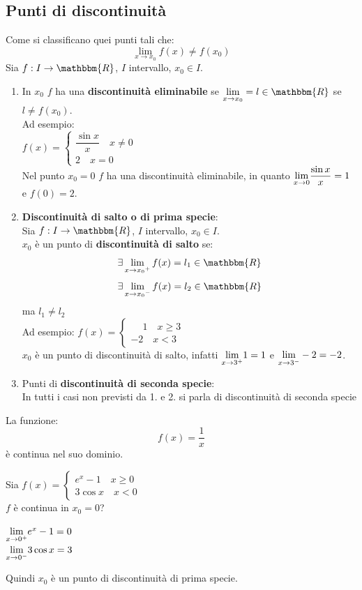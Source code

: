 \documentclass[12pt]{report}
\newcounter{exercise}
\begin{document}
  	\subsection{Punti di discontinuità}
  	Come si classificano quei punti tali che:
  	\[
  	\lim_{x \to {x_0}}f(x) \neq f(x_0)
  	\]
 	Sia $f: I \to \mathbbm{R}$, $I$ intervallo, $x_0 \in I$.		\begin{enumerate}
 		\item In $x_0$ $f$ ha una \textbf{discontinuità eliminabile} se $\mathlarger{\lim_{x \to {x_0}}} = l \in \mathbbm{R}$ se $l \neq f(x_0)$. \\
 		Ad esempio: \\

 		$f(x)=\begin{cases}
 			\dfrac{\sin x}{x} \quad x \neq 0 \\
 			2 \quad x = 0
 		\end{cases}$ \\
 		Nel punto $x_0 = 0$ $f$ ha una discontinuità eliminabile, in quanto $\mathlarger{\lim_{x \to 0}}\dfrac{\sin x}{x} = 1$ e $f(0) = 2$.
 		\item \textbf{Discontinuità di salto o di prima specie}: \\
 		Sia $f: I \to \mathbbm{R}$, $I$ intervallo, $x_0 \in I$. \\
 		$x_0$ è un punto di \textbf{discontinuità di salto} se:
 		\[
 		\exists \lim_{x \to {x_0}^+}f(x) = l_1 \in \mathbbm{R}
 		\]
 		\[
 		\exists \lim_{x \to {x_0}^-}f(x) = l_2 \in \mathbbm{R}
 		\]
 		ma $l_1 \neq l_2$ \\
 		Ad esempio: $f(x) = \begin{cases}
 			\phantom{-}1 \quad x \geq 3 \\
 			-2 \quad x < 3
 		\end{cases}$ \\
 		$x_0$ è un punto di discontinuità di salto, infatti $\mathlarger{\lim_{x \to 3^+}}1 = 1$ e $\mathlarger{\lim_{x \to 3^-}}-2 = -2$.
 		\item Punti di \textbf{discontinuità di seconda specie}: \\
 		In tutti i casi non previsti da 1. e 2.	 si parla di discontinuità di seconda specie
 	\end{enumerate}
 	\begin{note}{}{}
 		La funzione: \[
 		f(x) = \dfrac{1}{x}
 		\]
 		è continua nel suo dominio.
 	\end{note}
 	\begin{assignment}{}{}
 		Sia $f(x) = \begin{cases}
 			e^x - 1 \quad x \geq 0 \\
 			3\cos x \quad x < 0
 		\end{cases}$ \\
 		$f$ è continua in $x_0 = 0$? \\
 		\begin{exercise}{}{}
 			$\mathlarger{\lim_{x \to 0^+}}e^x - 1 = 0$ \\
 			$\mathlarger{\lim_{x \to 0^-}}3\cos x = 3$
 		\end{exercise}
 		Quindi $x_0$ è un punto di discontinuità di prima specie.
 	\end{assignment}
\end{document}
